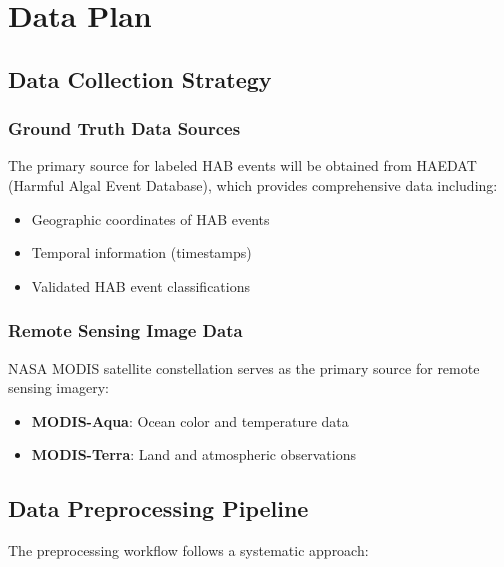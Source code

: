 \documentclass[12pt]{article}
\begin{document}
\section{Data Plan}
\subsection{Data Collection Strategy}

\subsubsection{Ground Truth Data Sources}
The primary source for labeled HAB events will be obtained from HAEDAT (Harmful Algal Event Database), which provides comprehensive data including:
\begin{itemize}
    \item Geographic coordinates of HAB events
    \item Temporal information (timestamps)
    \item Validated HAB event classifications
\end{itemize}

\subsubsection{Remote Sensing Image Data}
NASA MODIS satellite constellation serves as the primary source for remote sensing imagery:
\begin{itemize}
    \item \textbf{MODIS-Aqua}: Ocean color and temperature data
    \item \textbf{MODIS-Terra}: Land and atmospheric observations
\end{itemize}

\subsection{Data Preprocessing Pipeline}

The preprocessing workflow follows a systematic approach:

    \qquad {} \rightarrow {} \rightarrow {} \rightarrow {}
\end{document}
